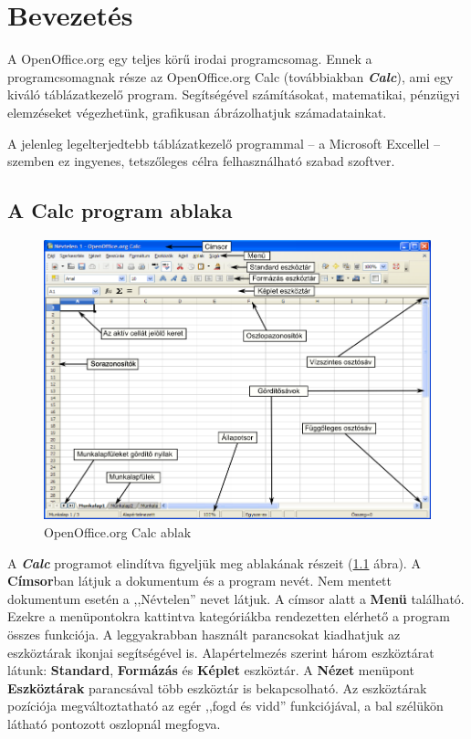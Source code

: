 \chapter{Bevezetés}
\thispagestyle{empty}

A OpenOffice.org egy teljes körű irodai programcsomag.  Ennek a
programcsomagnak része az OpenOffice.org Calc (továbbiakban
\textbf{\textit{Calc}}), ami egy kiváló táblázatkezelő
program. Segítségével számításokat, matematikai,
pénzügyi elemzéseket végezhetünk, grafikusan
ábrázolhatjuk számadatainkat.

A jelenleg legelterjedtebb táblázatkezelő programmal --  a
Microsoft Excellel --  szemben ez ingyenes, tetszőleges célra
felhasználható szabad szoftver.


\section{A Calc program ablaka}

\begin{figure}[!h]
\begin{center}
\includegraphics[width=13.999cm]{oocalcv2-img2.png}
\caption{OpenOffice.org Calc ablak}\label{Ablak}
\end{center}
\end{figure}

A \textbf{\textit{Calc}} programot elindítva figyeljük meg
ablakának részeit (\ref{Ablak} ábra). A \textbf{Címsor}ban látjuk a
 dokumentum és a program nevét. Nem mentett dokumentum esetén a
,,Névtelen'' nevet látjuk.  A
címsor alatt a \textbf{Menü} található. Ezekre a menüpontokra
kattintva kategóriákba rendezetten elérhető a program
összes funkciója. A  leggyakrabban használt parancsokat
kiadhatjuk az eszköztárak ikonjai segítségével is.
Alapértelmezés szerint három eszköztárat látunk:
\textbf{Standard}, \textbf{Formázás} és \textbf{Képlet}
eszköztár. A \textbf{Nézet} menüpont \textbf{Eszköztárak}
parancsával több eszköztár is bekapcsolható. Az
 eszköztárak pozíciója megváltoztatható az egér
,,fogd és vidd'' funkciójával, a
bal szélükön látható pontozott oszlopnál megfogva.

